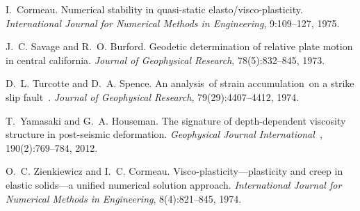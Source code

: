 
\begin{DoxyDescription}
\item[\label{_CITEREF_cormeau_75}%
\mbox{[}1\mbox{]}]I.~Cormeau. Numerical stability in quasi-\/static elasto/visco-\/plasticity. {\itshape International Journal for Numerical Methods in Engineering}, 9\-:109--127, 1975. 


\item[\label{_CITEREF_savage_burford_73}%
\mbox{[}2\mbox{]}]J.~C. Savage and R.~O. Burford. Geodetic determination of relative plate motion in central california. {\itshape Journal of Geophysical Research}, 78(5)\-:832--845, 1973.


\item[\label{_CITEREF_turcotte_spence_74}%
\mbox{[}3\mbox{]}]D.~L. Turcotte and D.~A. Spence. An analysis of strain accumulation on a strike slip fault . {\itshape Journal of Geophysical Research}, 79(29)\-:4407--4412, 1974.


\item[\label{_CITEREF_yamasaki_houseman_12}%
\mbox{[}4\mbox{]}]T.~Yamasaki and G.~A. Houseman. The signature of depth-\/dependent viscosity structure in post-\/seismic deformation. {\itshape Geophysical Journal International }, 190(2)\-:769--784, 2012. 


\item[\label{_CITEREF_zienkiewicz_cormeau_74}%
\mbox{[}5\mbox{]}]O.~C. Zienkiewicz and I.~C. Cormeau. Visco-\/plasticity—plasticity and creep in elastic solids—a unified numerical solution approach. {\itshape International Journal for Numerical Methods in Engineering}, 8(4)\-:821–845, 1974. 


\end{DoxyDescription}